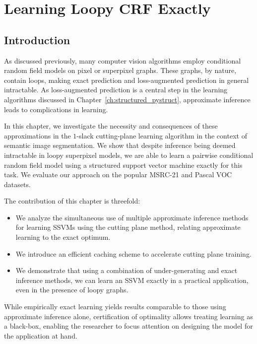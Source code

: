 \chapter{Learning Loopy CRF Exactly}\label{ch:exact_learning}

\section{Introduction}
As discussed previously, %
many computer vision algorithms employ conditional random
field models on pixel or superpixel graphs. These graphs, by nature, contain loops,
making exact prediction and loss-augmented prediction in general intractable.
As loss-augmented prediction is a central step in the learning algorithms
discussed in Chapter~\ref{ch:structured_pystruct}, approximate inference leads
to complications in learning.

In this chapter, we investigate the necessity and consequences of these
approximations in the $1$-slack cutting-plane learning algorithm in the context of semantic
image segmentation. We show that despite inference being deemed intractable in
loopy superpixel models, we are able to learn a pairwise conditional random
field model using a structured support vector machine exactly for this task.
We evaluate our approach on the popular MSRC-21 and Pascal VOC datasets. %

The contribution of this chapter is threefold:
\begin{itemize}
    \item We analyze the simultaneous use of multiple approximate inference
        methods for learning SSVMs using the cutting plane method, relating
        approximate learning to the exact optimum. %
    \item We introduce an efficient caching scheme to accelerate cutting plane
        training.
    \item We demonstrate that using a combination of under-generating and exact
        inference methods, we can learn an SSVM exactly in a practical
        application, even in the presence of loopy graphs.
\end{itemize}

While empirically exact learning yields results comparable to those using
approximate inference alone, certification of optimality allows treating
learning as a black-box, enabling the researcher to focus attention on
designing the model for the application at hand.


